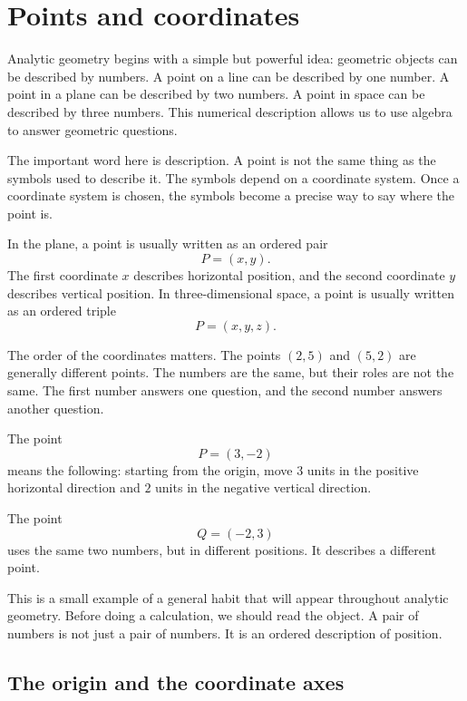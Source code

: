 \section{Points and coordinates}

Analytic geometry begins with a simple but powerful idea: geometric objects can be described by numbers. A point on a line can be described by one number. A point in a plane can be described by two numbers. A point in space can be described by three numbers. This numerical description allows us to use algebra to answer geometric questions.

The important word here is description. A point is not the same thing as the symbols used to describe it. The symbols depend on a coordinate system. Once a coordinate system is chosen, the symbols become a precise way to say where the point is.

\begin{definitionbox}
In the plane, a point is usually written as an ordered pair
\[
P=(x,y).
\]
The first coordinate \(x\) describes horizontal position, and the second coordinate \(y\) describes vertical position. In three-dimensional space, a point is usually written as an ordered triple
\[
P=(x,y,z).
\]
\end{definitionbox}

The order of the coordinates matters. The points \((2,5)\) and \((5,2)\) are generally different points. The numbers are the same, but their roles are not the same. The first number answers one question, and the second number answers another question.

\begin{examplebox}
The point
\[
P=(3,-2)
\]
means the following: starting from the origin, move \(3\) units in the positive horizontal direction and \(2\) units in the negative vertical direction.

The point
\[
Q=(-2,3)
\]
uses the same two numbers, but in different positions. It describes a different point.
\end{examplebox}

This is a small example of a general habit that will appear throughout analytic geometry. Before doing a calculation, we should read the object. A pair of numbers is not just a pair of numbers. It is an ordered description of position.

\subsection*{The origin and the coordinate axes}

